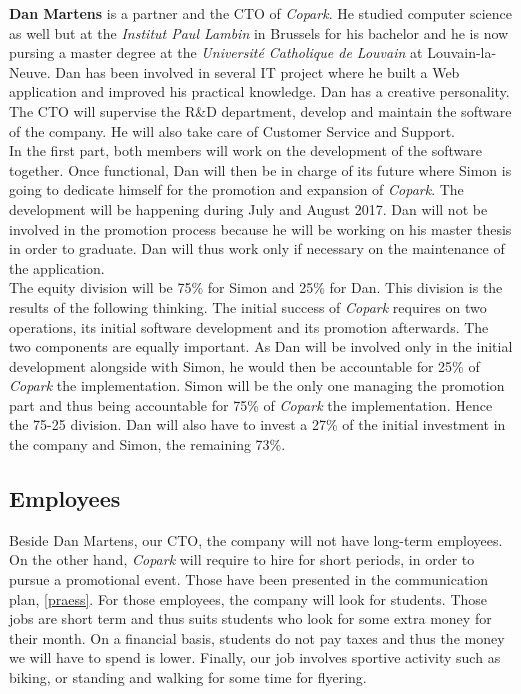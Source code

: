 \documentclass[12pt,a4paper,oneside]{book}
\newcommand{\bp}{\textit{Copark}}
\begin{document}
\textbf{Dan Martens} is a partner and the CTO of \bp{}. He studied computer science as well but at the \textit{Institut Paul Lambin} in Brussels for his bachelor and he is now pursing a master degree at the \textit{Université Catholique de Louvain} at Louvain-la-Neuve. Dan has been involved in several IT project where he built a Web application and improved his practical knowledge. Dan has a creative personality. The CTO will supervise the R\&D department, develop and maintain the software of the company. He will also take care of Customer Service and Support.\\

In the first part, both members will work on the development of the software together. Once functional, Dan will then be in charge of its future where Simon is going to dedicate himself for the promotion and expansion of \bp{}. The development will be happening during July and August 2017. Dan will not be involved in the promotion process because he will be working on his master thesis in order to graduate. Dan will thus work only if necessary on the maintenance of the application.\\

The equity division will be 75\% for Simon and 25\% for Dan. This division is the results of the following thinking. The initial success of \bp{} requires on two operations, its initial software development and its promotion afterwards. The two components are equally important. As Dan will be involved only in the initial development alongside with Simon, he would then be accountable for 25\% of \bp{} the implementation. Simon will be the only one managing the promotion part and thus being accountable for 75\% of \bp{} the implementation. Hence the 75-25 division. Dan will also have to invest a 27\% of the initial investment in the company and Simon, the remaining 73\%.

\subsection{Employees}

Beside Dan Martens, our CTO, the company will not have long-term employees. On the other hand, \bp{} will require to hire for short periods, in order to pursue a promotional event. Those have been presented in the communication plan, \autoref{praess}. For those employees, the company will look for students. Those jobs are short term and thus suits students who look for some extra money for their month. On a financial basis, students do not pay taxes and thus the money we will have to spend is lower. Finally, our job involves sportive activity such as biking, or standing and walking for some time for flyering.
\end{document}

